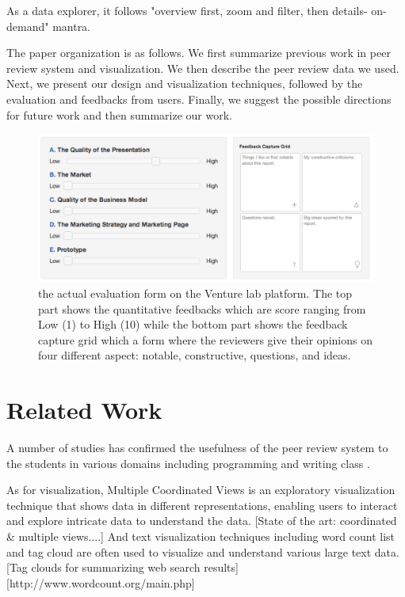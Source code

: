 \documentclass{sigchi}
\begin{document}
As a data explorer, it follows "overview first, zoom and filter, then details-
on-demand" mantra. \cite{card1999readings}


The paper organization is as follows.
We first summarize previous work in peer review system and visualization.
We then describe the peer review data we used.
Next, we present our design and visualization techniques,
followed by the evaluation and feedbacks from users.
Finally, we suggest the possible directions for future work
and then summarize our work.



\begin{figure}[!t]
\centering
\includegraphics[width=\columnwidth]{images/review-form}
\caption{the actual evaluation form on the Venture lab platform.
The top part shows the quantitative feedbacks which are score ranging
from Low (1) to High (10) while the bottom part shows the feedback capture grid
which a form where the reviewers give their opinions
on four different aspect: notable, constructive, questions, and ideas.}
\label{fig:review-form}
\end{figure}


\section{Related Work}

A number of studies has confirmed the usefulness of the peer review system
to the students in various domains including programming and writing class
\cite{MyPeerReview,WebBasedPeerReview}.

As for visualization, Multiple Coordinated Views is an exploratory visualization
technique that shows data in different representations, enabling users to
interact and explore intricate data to understand the data.  [State of the art:
coordinated \& multiple views....] And text visualization techniques including
word count list and tag cloud are often used to visualize and understand various
large text data.[Tag clouds for summarizing web search
results][http://www.wordcount.org/main.php]
\end{document}
